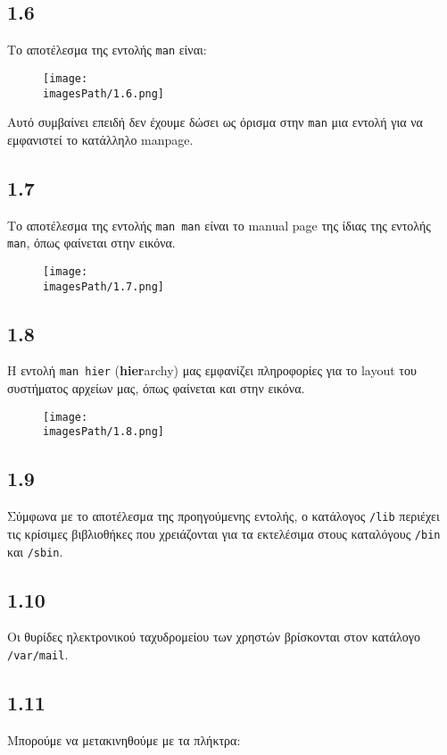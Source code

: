 \documentclass[a4paper, 12pt]{article}
\newcommand{\imagesPath}{.}
\begin{document}
	\subsection*{1.6}
		Το αποτέλεσμα της εντολής \verb|man| είναι:
		
		\begin{figure}[H]
			\texttt{[image: \\imagesPath/1.6.png]}
		\end{figure}
		
		Αυτό συμβαίνει επειδή δεν έχουμε δώσει ως όρισμα στην \verb|man| μια εντολή για να εμφανιστεί το κατάλληλο manpage.
	
	\subsection*{1.7}
		Το αποτέλεσμα της εντολής \verb|man man| είναι το manual page της ίδιας της εντολής \verb|man|, όπως φαίνεται στην εικόνα.
	
		\begin{figure}[H]
			\texttt{[image: \\imagesPath/1.7.png]}
		\end{figure}
	
	\subsection*{1.8}
		Η εντολή \verb|man hier| (\textbf{hier}archy) μας εμφανίζει πληροφορίες για το layout του συστήματος αρχείων μας, όπως φαίνεται και στην εικόνα.
	
		\begin{figure}[H]
			\texttt{[image: \\imagesPath/1.8.png]}
		\end{figure}
	
	\subsection*{1.9}
		Σύμφωνα με το αποτέλεσμα της προηγούμενης εντολής, ο κατάλογος \verb|/lib| περιέχει τις κρίσιμες βιβλιοθήκες που χρειάζονται για τα εκτελέσιμα στους καταλόγους \verb|/bin| και \verb|/sbin|.
			
	\subsection*{1.10}
		Οι θυρίδες ηλεκτρονικού ταχυδρομείου των χρηστών βρίσκονται στον κατάλογο \verb|/var/mail|.
	
	\subsection*{1.11}
		Μπορούμε να μετακινηθούμε με τα πλήκτρα: 
		
\end{document}
